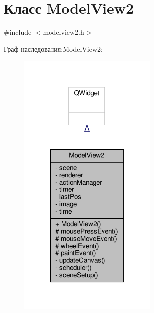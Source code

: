 \hypertarget{class_model_view2}{}\section{Класс Model\+View2}
\label{class_model_view2}


{\ttfamily \#include $<$modelview2.\+h$>$}



Граф наследования\+:Model\+View2\+:
\nopagebreak
\begin{figure}[H]
\begin{center}
\leavevmode
\includegraphics[width=191pt]{d8/d93/class_model_view2__inherit__graph}
\end{center}
\end{figure}


